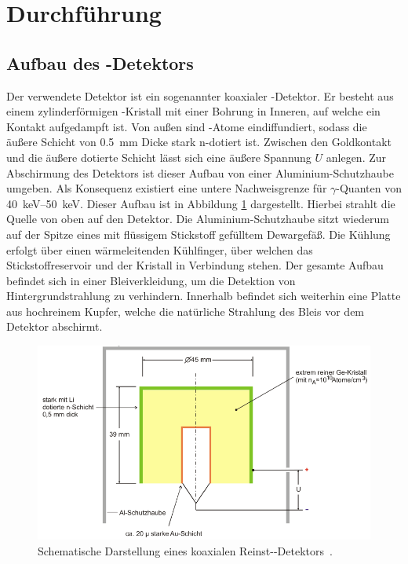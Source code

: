 \newpage
\section{Durchführung}
\label{sec:Durchführung}

\subsection{Aufbau des -Detektors}
\label{sec:AufbauDetektor}

Der verwendete Detektor ist ein sogenannter koaxialer -Detektor.
Er besteht aus einem zylinderförmigen -Kristall mit einer Bohrung in
Inneren, auf welche ein Kontakt aufgedampft ist. Von außen sind -Atome
eindiffundiert, sodass die äußere Schicht von \SI{0.5}{\milli\meter} Dicke
stark n-dotiert ist.
Zwischen den Goldkontakt und die äußere dotierte Schicht lässt sich eine äußere
Spannung $U$ anlegen.
Zur Abschirmung des Detektors ist dieser Aufbau von einer Aluminium-Schutzhaube
umgeben. Als Konsequenz existiert eine untere Nachweisgrenze für $\gamma$-Quanten
von \SIrange{40}{50}{\kilo\electronvolt}.
Dieser Aufbau ist in Abbildung \ref{fig:Versuchsaufbau} dargestellt.
Hierbei strahlt die Quelle von oben auf den Detektor.
Die Aluminium-Schutzhaube sitzt wiederum auf der Spitze eines mit flüssigem
Stickstoff gefülltem Dewargefäß. Die Kühlung erfolgt über einen wärmeleitenden
Kühlfinger, über welchen das Stickstoffreservoir und der Kristall in Verbindung stehen.
Der gesamte Aufbau befindet sich in einer Bleiverkleidung, um die Detektion
von Hintergrundstrahlung zu verhindern. Innerhalb befindet sich weiterhin eine
Platte aus hochreinem Kupfer, welche die natürliche Strahlung des Bleis vor dem
Detektor abschirmt.
\begin{figure}
	\centering
	\includegraphics[width=.8\textwidth]{images/Versuchsaufbau.pdf}
	\caption{Schematische Darstellung eines koaxialen Reinst--Detektors~\cite[14]{anleitung}.}
	\label{fig:Versuchsaufbau}
\end{figure}

